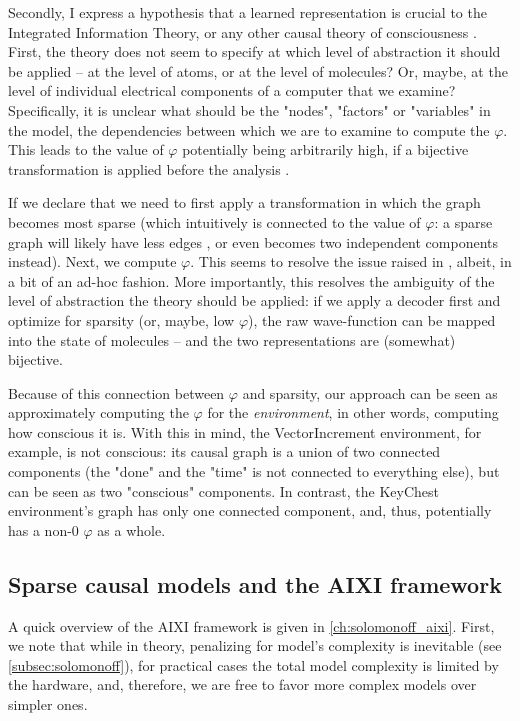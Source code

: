 \documentclass[a4paper,11pt,oneside]{report}
\begin{document}
Secondly, I express a hypothesis that a learned representation is crucial to the Integrated Information Theory, or any other causal theory of consciousness \cite{Tononi2016}. First, the theory does not seem to specify at which level of abstraction it should be applied -- at the level of atoms, or at the level of molecules? Or, maybe, at the level of individual electrical components of a computer that we examine? Specifically, it is unclear what should be the "nodes", "factors" or "variables" in the model, the dependencies between which we are to examine to compute the $\varphi$. This leads to the value of $\varphi$ potentially being arbitrarily high, if a bijective transformation is applied before the analysis \cite{Doerig2019}.

If we declare that we need to first apply a transformation in which the graph becomes most sparse (which intuitively is connected to the value of $\varphi$: a sparse graph will likely have less edges \cite{Seth2011,Johnson}, or even becomes two independent components instead). Next, we compute $\varphi$. This seems to resolve the issue raised in \cite{Doerig2019}, albeit, in a bit of an ad-hoc fashion. More importantly, this resolves the ambiguity of the level of abstraction the theory should be applied: if we apply a decoder first and optimize for sparsity (or, maybe, low $\varphi$), the raw wave-function can be mapped into the state of molecules -- and the two representations are (somewhat) bijective.

Because of this connection between $\varphi$ and sparsity, our approach can be seen as approximately computing the $\varphi$ for the {\em environment}, in other words, computing how conscious it is. With this in mind, the VectorIncrement environment, for example, is not conscious: its causal graph is a union of two connected components (the "done" and the "time" is not connected to everything else), but can be seen as two "conscious" components. In contrast, the KeyChest environment's graph has only one connected component, and, thus, potentially has a non-$0$ $\varphi$ as a whole.%

\subsection{Sparse causal models and the AIXI framework}
A quick overview of the AIXI framework is given in \autoref{ch:solomonoff_aixi}. First, we note that while in theory, penalizing for model's complexity is inevitable (see \autoref{subsec:solomonoff}), for practical cases the total model complexity is limited by the hardware, and, therefore, we are free to favor more complex models over simpler ones.
\end{document}
